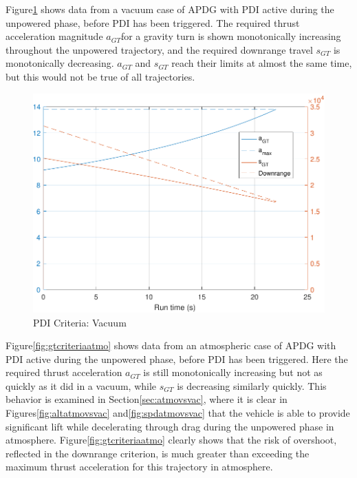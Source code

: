 Figure\:\ref{fig:gtcriteriavac} shows data from a vacuum case of APDG with PDI active during the unpowered phase, before PDI has been triggered. The required thrust acceleration magnitude $a_{GT}$for a gravity turn is shown monotonically increasing throughout the unpowered trajectory, and the required downrange travel $s_{GT}$ is monotonically decreasing. $a_{GT}$ and $s_{GT}$ reach their limits at almost the same time, but this would not be true of all trajectories.


\begin{figure}[H]
	\centering
	\begin{minipage}{4.5 in}
		\includegraphics[width=\linewidth]{Figures/gtcriteriavac.pdf}
		\caption{PDI Criteria: Vacuum \label{fig:gtcriteriavac} }
	\end{minipage}
\end{figure}

Figure\:\ref{fig:gtcriteriaatmo} shows data from an atmospheric case of APDG with PDI active during the unpowered phase, before PDI has been triggered. Here the required thrust acceleration $a_{GT}$ is still monotonically increasing but not as quickly as it did in a vacuum, while $s_{GT}$ is decreasing similarly quickly. This behavior is examined in Section\:\ref{sec:atmovsvac}, where it is clear in Figures\:\ref{fig:altatmovsvac} and\:\ref{fig:spdatmovsvac} that the vehicle is able to provide significant lift while decelerating through drag during the unpowered phase in atmosphere. Figure\:\ref{fig:gtcriteriaatmo} clearly shows that the risk of overshoot, reflected in the downrange criterion, is much greater than exceeding the maximum thrust acceleration for this trajectory in atmosphere.


